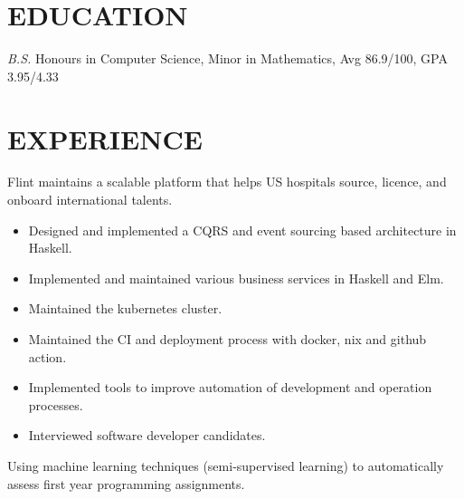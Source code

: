 \documentclass{resume}
\begin{document}


\section{EDUCATION}
\textit{B.S.} Honours in Computer Science, Minor in Mathematics, Avg 86.9/100, GPA 3.95/4.33

\section{EXPERIENCE}
    Flint maintains a scalable platform that helps US hospitals source, licence, and onboard international talents.

    \begin{itemize}
        \item Designed and implemented a CQRS and event sourcing based architecture in Haskell.

        \item Implemented and maintained various business services in Haskell and Elm. 

        \item Maintained the kubernetes cluster.

        \item Maintained the CI and deployment process with docker, nix and github action.

        \item Implemented tools to improve automation of development and operation processes. 

        \item Interviewed software developer candidates.
    \end{itemize}

     \vspace{-0.1in}

        Using machine learning techniques (semi-supervised learning) to automatically assess first year programming assignments.
\end{document}
